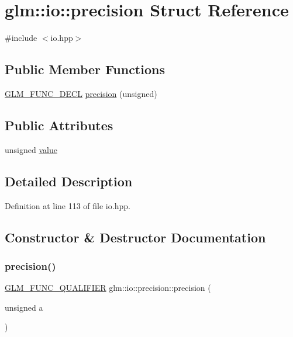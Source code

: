 \hypertarget{structglm_1_1io_1_1precision}{}\section{glm\+::io\+::precision Struct Reference}
\label{structglm_1_1io_1_1precision}


{\ttfamily \#include $<$io.\+hpp$>$}

\subsection*{Public Member Functions}
\begin{DoxyCompactItemize}
\item 
\mbox{\hyperlink{setup_8hpp_ab2d052de21a70539923e9bcbf6e83a51}{G\+L\+M\+\_\+\+F\+U\+N\+C\+\_\+\+D\+E\+CL}} \mbox{\hyperlink{structglm_1_1io_1_1precision_aa359e1766fd74b88e049d5449d521447}{precision}} (unsigned)
\end{DoxyCompactItemize}
\subsection*{Public Attributes}
\begin{DoxyCompactItemize}
\item 
unsigned \mbox{\hyperlink{structglm_1_1io_1_1precision_a43da772dff9a209768c63f1220d52074}{value}}
\end{DoxyCompactItemize}


\subsection{Detailed Description}


Definition at line 113 of file io.\+hpp.



\subsection{Constructor \& Destructor Documentation}
\mbox{\label{structglm_1_1io_1_1precision_aa359e1766fd74b88e049d5449d521447}} 
\subsubsection{\texorpdfstring{precision()}{precision()}}
{\footnotesize\ttfamily \mbox{\hyperlink{setup_8hpp_a33fdea6f91c5f834105f7415e2a64407}{G\+L\+M\+\_\+\+F\+U\+N\+C\+\_\+\+Q\+U\+A\+L\+I\+F\+I\+ER}} glm\+::io\+::precision\+::precision (\begin{DoxyParamCaption}\item[{unsigned}]{a }\end{DoxyParamCaption})\hspace{0.3cm}{\ttfamily [explicit]}}



